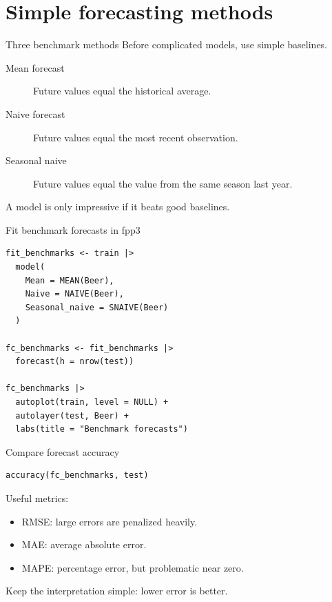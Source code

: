 \documentclass[aspectratio=169,11pt]{beamer}
\begin{document}
\section{Simple forecasting methods}

\begin{frame}{Three benchmark methods}
Before complicated models, use simple baselines.

\vspace{0.2cm}
\begin{description}
  \item[Mean forecast] Future values equal the historical average.
  \item[Naive forecast] Future values equal the most recent observation.
  \item[Seasonal naive] Future values equal the value from the same season last year.
\end{description}

\vspace{0.4cm}
A model is only impressive if it beats good baselines.
\end{frame}

\begin{frame}[fragile]{Fit benchmark forecasts in fpp3}
\begin{lstlisting}
fit_benchmarks <- train |>
  model(
    Mean = MEAN(Beer),
    Naive = NAIVE(Beer),
    Seasonal_naive = SNAIVE(Beer)
  )

fc_benchmarks <- fit_benchmarks |>
  forecast(h = nrow(test))

fc_benchmarks |>
  autoplot(train, level = NULL) +
  autolayer(test, Beer) +
  labs(title = "Benchmark forecasts")
\end{lstlisting}
\end{frame}

\begin{frame}[fragile]{Compare forecast accuracy}
\begin{lstlisting}
accuracy(fc_benchmarks, test)
\end{lstlisting}

\vspace{0.4cm}
Useful metrics:
\begin{itemize}
  \item RMSE: large errors are penalized heavily.
  \item MAE: average absolute error.
  \item MAPE: percentage error, but problematic near zero.
\end{itemize}

\vspace{0.3cm}
Keep the interpretation simple: lower error is better.
\end{frame}
\end{document}
